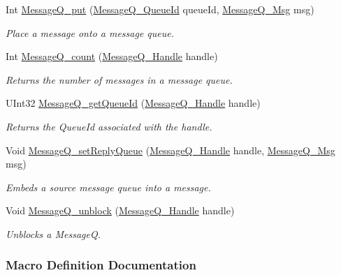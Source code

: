 \begin{DoxyCompactItemize}
Int \hyperlink{_message_q_8h_aa628f9bf897924f61d6adfba3f82fa8d}{Message\-Q\-\_\-put} (\hyperlink{_message_q_8h_a34dd32b58cf0476c2d90e3f702843297}{Message\-Q\-\_\-\-Queue\-Id} queue\-Id, \hyperlink{_message_q_8h_ab675d3cdd0443a1ad05658d375458204}{Message\-Q\-\_\-\-Msg} msg)
\begin{DoxyCompactList}\small\item\em Place a message onto a message queue. \end{DoxyCompactList}\item 
Int \hyperlink{_message_q_8h_a5e2f02d046b2bb16dce6b41f9b4c5ad3}{Message\-Q\-\_\-count} (\hyperlink{_message_q_8h_a1d584ce08733ca864d81e1e64a41cf7a}{Message\-Q\-\_\-\-Handle} handle)
\begin{DoxyCompactList}\small\item\em Returns the number of messages in a message queue. \end{DoxyCompactList}\item 
U\-Int32 \hyperlink{_message_q_8h_af9d9030e493a5a6f961d84900e313623}{Message\-Q\-\_\-get\-Queue\-Id} (\hyperlink{_message_q_8h_a1d584ce08733ca864d81e1e64a41cf7a}{Message\-Q\-\_\-\-Handle} handle)
\begin{DoxyCompactList}\small\item\em Returns the Queue\-Id associated with the handle. \end{DoxyCompactList}\item 
Void \hyperlink{_message_q_8h_a2532f1ebf44ae91a8fd8f63a49e44802}{Message\-Q\-\_\-set\-Reply\-Queue} (\hyperlink{_message_q_8h_a1d584ce08733ca864d81e1e64a41cf7a}{Message\-Q\-\_\-\-Handle} handle, \hyperlink{_message_q_8h_ab675d3cdd0443a1ad05658d375458204}{Message\-Q\-\_\-\-Msg} msg)
\begin{DoxyCompactList}\small\item\em Embeds a source message queue into a message. \end{DoxyCompactList}\item 
Void \hyperlink{_message_q_8h_ae9491bc9f790e267836f27ad2e31d7de}{Message\-Q\-\_\-unblock} (\hyperlink{_message_q_8h_a1d584ce08733ca864d81e1e64a41cf7a}{Message\-Q\-\_\-\-Handle} handle)
\begin{DoxyCompactList}\small\item\em Unblocks a Message\-Q. \end{DoxyCompactList}\end{DoxyCompactItemize}


\subsubsection{Macro Definition Documentation}
